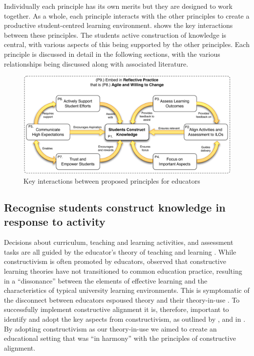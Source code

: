 Individually each principle has its own merits but they are designed to work together. As a whole, each principle interacts with the other principles to create a productive student-centred learning environment.  shows the key interactions between these principles. The students active construction of knowledge is central, with various aspects of this being supported by the other principles. Each principle is discussed in detail in the following sections, with the various relationships being discussed along with associated literature.

\begin{figure}[htbp]
	\centering
	\includegraphics[width=\textwidth]{HowPrinciples}
	\caption{Key interactions between proposed principles for educators}
	\label{fig:how_principles}
\end{figure}


\subsection{Recognise students construct knowledge in response to activity} %
\label{ssub:ideas_adopted_from_constructivism}

Decisions about curriculum, teaching and learning activities, and assessment tasks are all guided by the educator's theory of teaching and learning \cite{Argyris:1976,Ramsden:1992}. While constructivism is often promoted by educators, \citet{Phillips:2005} observed that constructive learning theories have not transitioned to common education practice, resulting in a ``dissonance'' between the elements of effective learning and the characteristics of typical university learning environments. This is symptomatic of the disconnect between educators espoused theory and their theory-in-use \cite{Argyris:1976}. To successfully implement constructive alignment it is, therefore, important to identify and adopt the key aspects from constructivism, as outlined by \citet{Biggs:1996c}, \citet{Biggs:1997} and in \citet{Biggs:2007}. By adopting constructivism as our theory-in-use we aimed to create an educational setting that was ``in harmony'' with the principles of constructive alignment.

